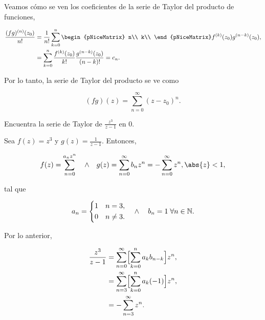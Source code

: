 \documentclass[../main.tex]{subfiles}
\begin{document}
Veamos cómo se ven los coeficientes de la serie de Taylor del producto de funciones,

\begin{align*}
    \dfrac{(fg)^{(n)}(z_{0})}{n!} &= \dfrac{1}{n!}\sum_{k = 0}^{n}
    \begin{pNiceMatrix}
        n\\
        k\\
    \end{pNiceMatrix}
    f^{(k)}(z_{0})g^{(n - k)}(z_{0}),\\
    &= \sum_{k = 0}^{n}\dfrac{f^{(k)}(z_{0})}{k!}\dfrac{g^{(n - k)}(z_{0})}{(n -
    k)!} = c_{n}.
\end{align*}

Por lo tanto, la serie de Taylor del producto se ve como

\begin{equation*}
    (fg)(z) = \sum_{n = 0}^{\infty}(z - z_{0})^{n}.
\end{equation*}

\begin{example}
    Encuentra la serie de Taylor de \(\tfrac{z^{3}}{z - 1}\) en \(0\).

    Sea \(f(z) = z^{3}\) y \(g(z) = \tfrac{1}{z - 1}\). Entonces,

    \begin{equation*}
        f(z) = \sum_{n = 0}^{a_{n}z^{n}}\quad \wedge\quad g(z) = \sum_{n =
        0}^{\infty}b_{n}z^{n} = - \sum_{n = 0}^{\infty}z^{n}, \abs{z} < 1,
    \end{equation*}

    tal que

    \begin{equation*}
        a_{n} =
        \begin{dcases}
            1 & n = 3,\\
            0 & n \neq 3.
        \end{dcases}
        \quad
        \wedge
        \quad
        b_{n} = 1\; \forall n\in \mathbb{N}.
    \end{equation*}

    Por lo anterior,

    \begin{align*}
        \dfrac{z^{3}}{z - 1} &= \sum_{n = 0}^{\infty}\Bigl[\sum_{k = 0}^{n}a_{k}b_{n -
        k}\Bigr]z^{n},\\
        &= \sum_{n = 3}^{\infty}\Bigl[\sum_{k = 0}^{n}a_{k}(-1)\Bigr]z^{n},\\
        &= - \sum_{n = 3}^{\infty}z^{n}.
    \end{align*}
\end{example}
\end{document}
